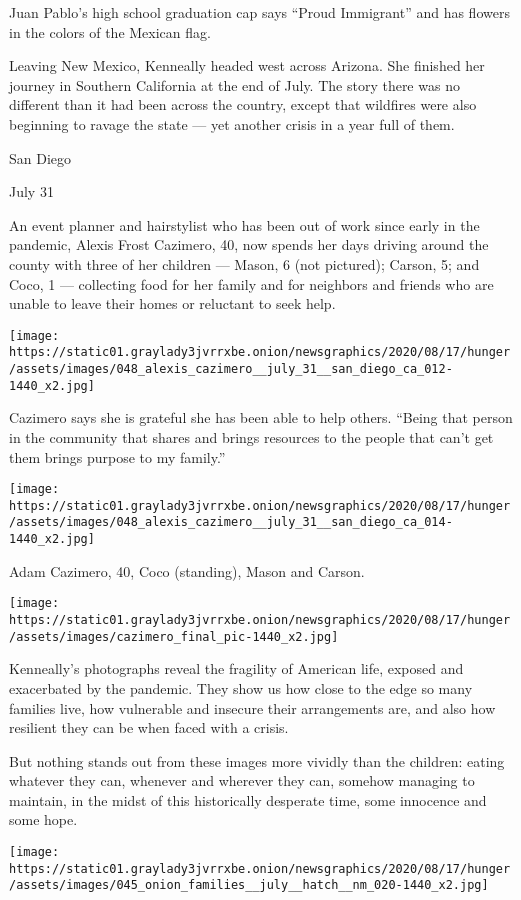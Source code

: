 Juan Pablo's high school graduation cap says ``Proud Immigrant'' and has
flowers in the colors of the Mexican flag.

Leaving New Mexico, Kenneally headed west across Arizona. She finished
her journey in Southern California at the end of July. The story there
was no different than it had been across the country, except that
wildfires were also beginning to ravage the state --- yet another crisis
in a year full of them.

San Diego

July 31

An event planner and hairstylist who has been out of work since early in
the pandemic, Alexis Frost Cazimero, 40, now spends her days driving
around the county with three of her children --- Mason, 6 (not
pictured); Carson, 5; and Coco, 1 --- collecting food for her family and
for neighbors and friends who are unable to leave their homes or
reluctant to seek help.

\texttt{[image: https://static01.graylady3jvrrxbe.onion/newsgraphics/2020/08/17/hunger/assets/images/048\_alexis\_cazimero\_\_july\_31\_\_san\_diego\_ca\_012-1440\_x2.jpg]}

Cazimero says she is grateful she has been able to help others. ``Being
that person in the community that shares and brings resources to the
people that can't get them brings purpose to my family.''

\texttt{[image: https://static01.graylady3jvrrxbe.onion/newsgraphics/2020/08/17/hunger/assets/images/048\_alexis\_cazimero\_\_july\_31\_\_san\_diego\_ca\_014-1440\_x2.jpg]}

Adam Cazimero, 40, Coco (standing), Mason and Carson.

\texttt{[image: https://static01.graylady3jvrrxbe.onion/newsgraphics/2020/08/17/hunger/assets/images/cazimero\_final\_pic-1440\_x2.jpg]}

Kenneally's photographs reveal the fragility of American life, exposed
and exacerbated by the pandemic. They show us how close to the edge so
many families live, how vulnerable and insecure their arrangements are,
and also how resilient they can be when faced with a crisis.

But nothing stands out from these images more vividly than the children:
eating whatever they can, whenever and wherever they can, somehow
managing to maintain, in the midst of this historically desperate time,
some innocence and some hope.

\texttt{[image: https://static01.graylady3jvrrxbe.onion/newsgraphics/2020/08/17/hunger/assets/images/045\_onion\_families\_\_july\_\_hatch\_\_nm\_020-1440\_x2.jpg]}

